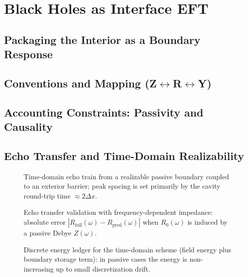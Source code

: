 \section{Black Holes as Interface EFT} \label{sec:blackholes}
  
  \subsection{Packaging the Interior as a Boundary Response} \label{sec:bh-interface}
    
    
  \subsection{Conventions and Mapping (Z\texorpdfstring{$\leftrightarrow$}{<->}R\texorpdfstring{$\leftrightarrow$}{<->}Y)} \label{sec:bh-conventions}
    
  \subsection{Accounting Constraints: Passivity and Causality} \label{sec:bh-accounting}
    
    
  \subsection{Echo Transfer and Time-Domain Realizability} \label{sec:bh-echoes}
    
    
    \begin{figure}[t]
      \centering
      \caption{Time-domain echo train from a realizable passive boundary coupled to an exterior barrier; peak spacing is set primarily by the cavity round-trip time $\approx 2\Delta x$.}
      \label{fig:bh-echo-waveform}
    \end{figure}
    \begin{figure}[t]
      \centering
      \caption{Echo transfer validation with frequency-dependent impedance: absolute error $|R_{\mathrm{full}}(\omega)-R_{\mathrm{pred}}(\omega)|$ when $R_0(\omega)$ is induced by a passive Debye $Z(\omega)$.}
      \label{fig:bh-freqdep-echo-error}
    \end{figure}
    \begin{figure}[t]
      \centering
      \caption{Discrete energy ledger for the time-domain scheme (field energy plus boundary storage term): in passive cases the energy is non-increasing up to small discretization drift.}
      \label{fig:bh-energy-ledger}
    \end{figure}
